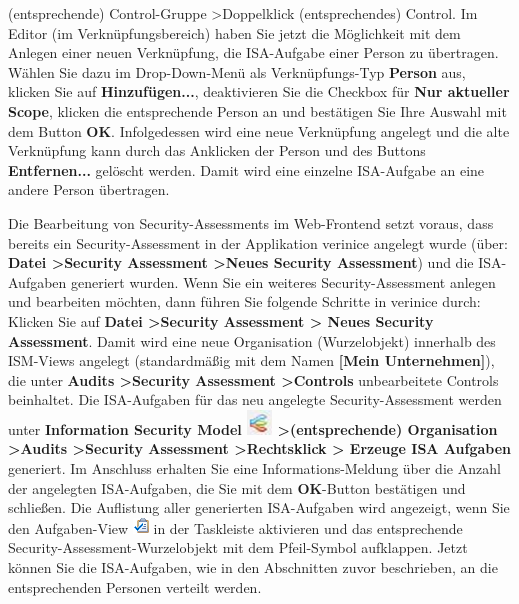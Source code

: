 \documentclass[a4paper,10pt]{book}
\begin{document}
\begin{itemize}
{(entsprechende) Control-Gruppe \textgreater Doppelklick (entsprechendes) Control}. Im Editor (im Verknüpfungsbereich) haben Sie jetzt die Möglichkeit mit
dem Anlegen einer neuen Verknüpfung, die ISA-Aufgabe einer Person zu übertragen. Wählen Sie dazu im Drop-Down-Menü als Verknüpfungs-Typ \textbf{Person} aus,
klicken Sie auf \textbf{Hinzufügen...}, deaktivieren Sie die Checkbox für \textbf{Nur aktueller Scope}, klicken die entsprechende Person an und bestätigen
Sie Ihre Auswahl mit dem Button \textbf{OK}. Infolgedessen wird eine neue Verknüpfung angelegt und die alte Verknüpfung kann durch das Anklicken der Person
und des Buttons \textbf{Entfernen...} gelöscht werden. Damit wird eine einzelne ISA-Aufgabe an eine andere Person übertragen.
\end{itemize}
Die Bearbeitung von Security-Assessments im Web-Frontend setzt voraus, dass bereits ein Security-Assessment in der Applikation verinice angelegt wurde
(über: \textbf{Datei \textgreater Security Assessment \textgreater Neues Security Assessment}) und die ISA-Aufgaben generiert wurden. Wenn Sie ein weiteres Security-Assessment
anlegen und bearbeiten möchten, dann führen Sie folgende Schritte in verinice durch: Klicken Sie auf \textbf{Datei \textgreater Security Assessment \textgreater
Neues Security Assessment}. Damit wird eine neue Organisation (Wurzelobjekt) innerhalb des ISM-Views angelegt (standardmäßig mit dem Namen
\textbf{[Mein Unternehmen]}), die unter \textbf{Audits \textgreater Security Assessment \textgreater Controls} unbearbeitete Controls beinhaltet.
Die ISA-Aufgaben für das neu angelegte Security-Assessment werden unter \textbf{Information Security Model
\includegraphics[height=2ex]{Icon/Informationssicherheitsmodell.png} \textgreater (entsprechende) Organisation \textgreater Audits \textgreater Security Assessment \textgreater Rechtsklick \textgreater
Erzeuge ISA Aufgaben} generiert. Im Anschluss erhalten Sie eine Informations-Meldung über die
Anzahl der angelegten ISA-Aufgaben, die Sie mit dem \textbf{OK}-Button bestätigen und schließen.
Die Auflistung aller generierten ISA-Aufgaben wird angezeigt, wenn Sie den Aufgaben-View
\includegraphics[height=2ex]{Icon/Tasks.png} in der Taskleiste aktivieren und das entsprechende Security-Assessment-Wurzelobjekt mit
dem Pfeil-Symbol aufklappen. Jetzt können Sie die ISA-Aufgaben, wie in den Abschnitten zuvor beschrieben, an die entsprechenden Personen verteilt werden.
\end{document}
